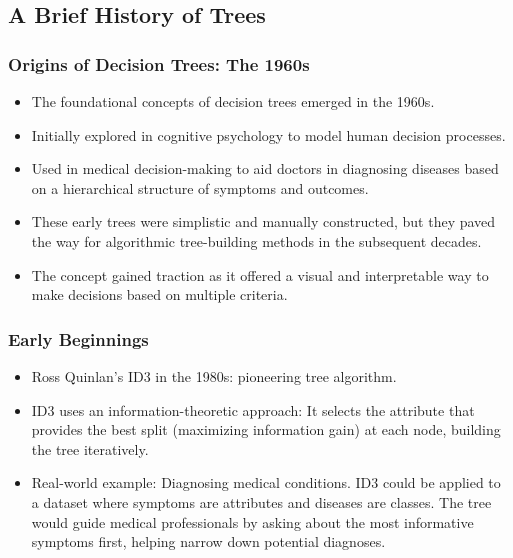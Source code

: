 \documentclass{beamer}
\begin{document}
\subsection{A Brief History of Trees}

\begin{frame}
\frametitle{Origins of Decision Trees: The 1960s}
\begin{itemize}
    \item The foundational concepts of decision trees emerged in the 1960s.
    \item Initially explored in cognitive psychology to model human decision processes.
    \item Used in medical decision-making to aid doctors in diagnosing diseases based on a hierarchical structure of symptoms and outcomes.
    \item These early trees were simplistic and manually constructed, but they paved the way for algorithmic tree-building methods in the subsequent decades.
    \item The concept gained traction as it offered a visual and interpretable way to make decisions based on multiple criteria.
\end{itemize}
\end{frame}

\begin{frame}
\frametitle{Early Beginnings}
\begin{itemize}
    \item Ross Quinlan's ID3 in the 1980s: pioneering tree algorithm.
    \item ID3 uses an information-theoretic approach: It selects the attribute that provides the best split (maximizing information gain) at each node, building the tree iteratively.
    \item Real-world example: Diagnosing medical conditions. ID3 could be applied to a dataset where symptoms are attributes and diseases are classes. The tree would guide medical professionals by asking about the most informative symptoms first, helping narrow down potential diagnoses.
\end{itemize}
\end{frame}
\end{document}
